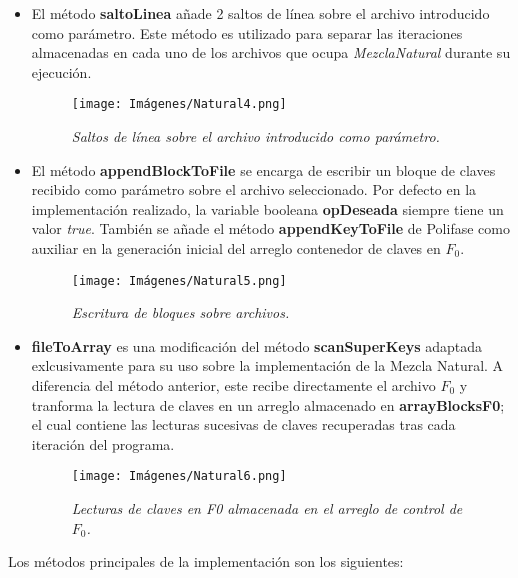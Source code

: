 \documentclass[letterpaper,12pt]{extarticle}
\begin{document}
\begin{itemize}
\item El método \textbf{saltoLinea} añade 2 saltos de línea sobre el archivo introducido como parámetro. Este método es utilizado para separar las iteraciones almacenadas en cada uno de los archivos que ocupa \textit{MezclaNatural} durante su ejecución.

\begin{figure}[h!]
    \centering
    \texttt{[image: Imágenes/Natural4.png]}
    \caption{\textit{Saltos de línea sobre el archivo introducido como parámetro.}}
    \label{fig:Natural4}
    \end{figure} 
    
\item El método \textbf{appendBlockToFile} se encarga de escribir un bloque de claves recibido como parámetro sobre el archivo seleccionado. Por defecto en la implementación realizado, la variable booleana \textbf{opDeseada} siempre tiene un valor \textit{true}. También se añade el método \textbf{appendKeyToFile} de Polifase como auxiliar en la generación inicial del arreglo contenedor de claves en $F_{0}$.

\begin{figure}[h!]
    \centering
    \texttt{[image: Imágenes/Natural5.png]}
    \caption{\textit{Escritura de bloques sobre archivos.}}
    \label{fig:Natural5}
    \end{figure} 
    
    
\item \textbf{fileToArray} es una modificación del método \textbf{scanSuperKeys} adaptada exlcusivamente para su uso sobre la implementación de la Mezcla Natural. A diferencia del método anterior, este recibe directamente el archivo $F_{0}$ y tranforma la lectura de claves en un arreglo almacenado en \textbf{arrayBlocksF0}; el cual contiene las lecturas sucesivas de claves recuperadas tras cada iteración del programa. 

\begin{figure}[h!]
    \centering
    \texttt{[image: Imágenes/Natural6.png]}
    \caption{\textit{Lecturas de claves en F0 almacenada en el arreglo de control de $F_{0}$.}}
    \label{fig:Natural6}
    \end{figure} 


\end{itemize}

\noindent Los métodos principales de la implementación son los siguientes:
\end{document}

